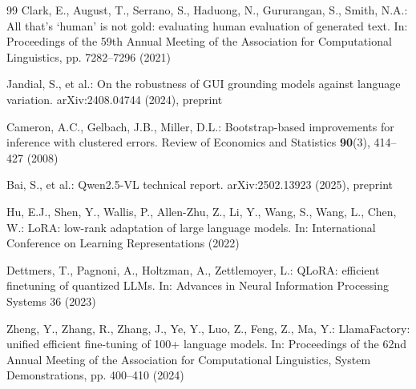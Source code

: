 \documentclass[runningheads,a4paper]{llncs}
\begin{document}
\begin{thebibliography}{99}
Clark, E., August, T., Serrano, S., Haduong, N., Gururangan, S., Smith, N.A.: All that's `human'
is not gold: evaluating human evaluation of generated text. In: Proceedings of the 59th Annual
Meeting of the Association for Computational Linguistics, pp. 7282--7296 (2021)

Jandial, S., et al.: On the robustness of GUI grounding models against language variation.
arXiv:2408.04744 (2024), preprint

Cameron, A.C., Gelbach, J.B., Miller, D.L.: Bootstrap-based improvements for inference with
clustered errors. Review of Economics and Statistics \textbf{90}(3), 414--427 (2008)

Bai, S., et al.: Qwen2.5-VL technical report. arXiv:2502.13923 (2025), preprint

Hu, E.J., Shen, Y., Wallis, P., Allen-Zhu, Z., Li, Y., Wang, S., Wang, L., Chen, W.: LoRA:
low-rank adaptation of large language models. In: International Conference on Learning
Representations (2022)

Dettmers, T., Pagnoni, A., Holtzman, A., Zettlemoyer, L.: QLoRA: efficient finetuning of quantized
LLMs. In: Advances in Neural Information Processing Systems 36 (2023)

Zheng, Y., Zhang, R., Zhang, J., Ye, Y., Luo, Z., Feng, Z., Ma, Y.: LlamaFactory: unified efficient
fine-tuning of 100+ language models. In: Proceedings of the 62nd Annual Meeting of the Association
for Computational Linguistics, System Demonstrations, pp. 400--410 (2024)

\end{thebibliography}
\end{document}
